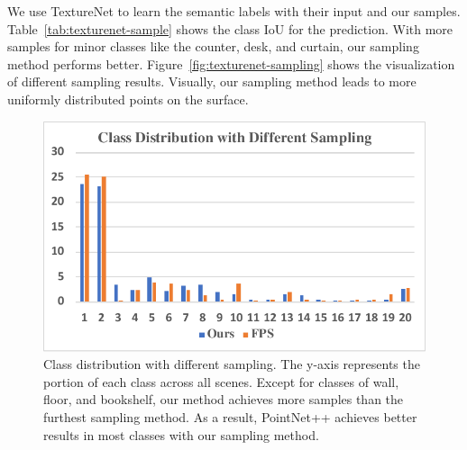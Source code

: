 We use TextureNet to learn the semantic labels with their input and our samples. Table~\ref{tab:texturenet-sample} shows the  class IoU for the prediction. With more samples for minor classes like the counter, desk, and curtain, our sampling method performs better. Figure~\ref{fig:texturenet-sampling} shows the visualization of different sampling results. Visually, our sampling method leads to more uniformly distributed points on the surface.

\begin{figure}[h]
    \centering
    \includegraphics[width=0.6\linewidth]{texturenet/diagram/class.pdf}
    \caption{Class distribution with different sampling. The y-axis represents the portion of each class across all scenes. Except for classes of wall, floor, and bookshelf, our method achieves more samples than the furthest sampling method. As a result, PointNet++ achieves better results in most classes with our sampling method.}
    \label{fig:texturenet-sampling-vis}
\end{figure}




